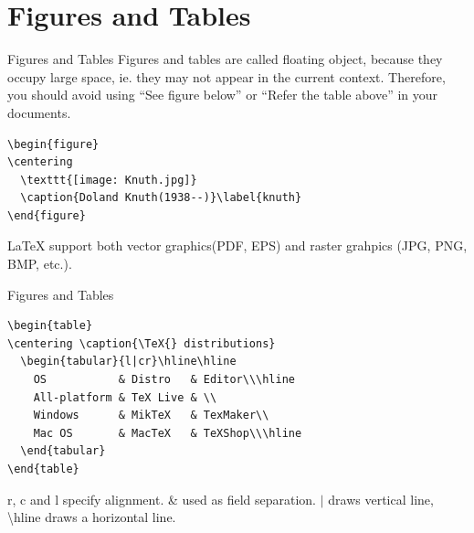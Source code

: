 \documentclass[10pt]{beamer}
\begin{document}
\section{Figures and Tables}
\begin{frame}[fragile]{Figures and Tables}
    Figures and tables are called floating object, because they occupy
    large space, ie. they may not appear in the current context.
    Therefore, you should avoid using ``See figure below'' or
    ``Refer the table above'' in your documents.

\begin{verbatim}
\begin{figure}
\centering
  \texttt{[image: Knuth.jpg]}
  \caption{Doland Knuth(1938--)}\label{knuth}
\end{figure}
\end{verbatim}

    \LaTeX{} support both vector graphics(PDF, EPS) and raster grahpics
    (JPG, PNG, BMP, etc.).

\end{frame}

\begin{frame}[fragile]{Figures and Tables}
\begin{verbatim}
\begin{table}
\centering \caption{\TeX{} distributions}
  \begin{tabular}{l|cr}\hline\hline
    OS           & Distro   & Editor\\\hline
    All-platform & TeX Live & \\
    Windows      & MikTeX   & TexMaker\\
    Mac OS       & MacTeX   & TeXShop\\\hline
  \end{tabular}
\end{table}
\end{verbatim}
    \alert{r}, \alert{c} and \alert{l} specify alignment.
    \alert{\&} used as field separation. \alert{$|$} draws vertical
    line, \alert{\textbackslash hline} draws a horizontal line.
\end{frame}
\end{document}
